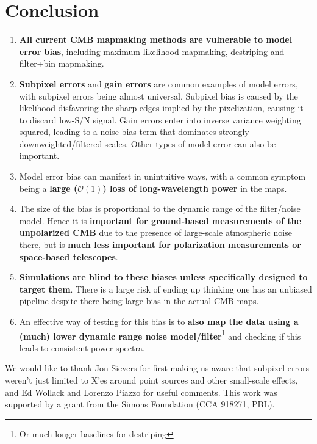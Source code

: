 \documentclass{aa}
\begin{document}
\section{Conclusion}

\begin{enumerate}
	\item \textbf{All current CMB mapmaking methods are vulnerable to model error bias},
		including maximum-likelihood mapmaking, destriping and filter+bin mapmaking.
	\item \textbf{Subpixel errors} and \textbf{gain errors} are common examples of
		model errors, with subpixel errors being almost universal.
		Subpixel bias is caused by the likelihood disfavoring the sharp edges implied by
		the pixelization, causing it to discard low-S/N signal. Gain errors enter into inverse
		variance weighting squared, leading to a noise bias term that dominates strongly downweighted/filtered scales.
		Other types of model error can also be important.
	\item Model error bias can manifest in unintuitive ways, with a common symptom
		being a \textbf{large ($\mathcal{O}(1)$) loss of long-wavelength power} in the maps.
	\item The size of the bias is proportional to the dynamic range of the filter/noise model.
		Hence it is \textbf{important for ground-based measurements of the unpolarized CMB}
		due to the presence of large-scale atmospheric noise there, but is \textbf{much less
		important for polarization measurements or space-based telescopes}.
	\item \textbf{Simulations are blind to these biases unless specifically designed to
		target them}. There is a large risk of ending up thinking one has an unbiased
		pipeline despite there being large bias in the actual CMB maps.
	\item An effective way of testing for this bias is to \textbf{also map the data using a
		(much) lower dynamic range noise model/filter}\footnote{Or much longer baselines for destriping}
		and checking if this leads to consistent power spectra.
\end{enumerate}

\begin{acknowledgements}
We would like to thank Jon Sievers for first making us aware
that subpixel errors weren't just limited to X'es around point
sources and other small-scale effects, and Ed Wollack and Lorenzo Piazzo for useful comments.
This work was supported by a grant from the Simons Foundation (CCA 918271, PBL).
\end{acknowledgements}
\end{document}
